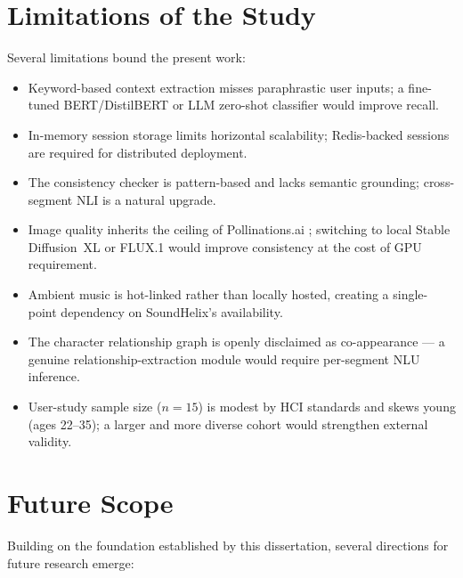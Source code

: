 \section{Limitations of the Study}
Several limitations bound the present work:

\begin{itemize}
    \item Keyword-based context extraction misses paraphrastic user
    inputs; a fine-tuned BERT/DistilBERT \cite{devlin2019bert,sanh2019distilbert}
    or LLM zero-shot classifier would improve recall.
    \item In-memory session storage limits horizontal scalability;
    Redis-backed sessions are required for distributed deployment.
    \item The consistency checker is pattern-based and lacks
    semantic grounding; cross-segment NLI \cite{williams2018mnli}
    is a natural upgrade.
    \item Image quality inherits the ceiling of Pollinations.ai
    \cite{pollinations2024api}; switching to local Stable
    Diffusion~XL \cite{podell2024sdxl} or FLUX.1 \cite{bfl2024flux}
    would improve consistency at the cost of GPU requirement.
    \item Ambient music is hot-linked rather than locally hosted,
    creating a single-point dependency on SoundHelix's availability.
    \item The character relationship graph is openly disclaimed as
    co-appearance --- a genuine relationship-extraction module
    would require per-segment NLU inference.
    \item User-study sample size ($n=15$) is modest by HCI standards
    and skews young (ages 22--35); a larger and more diverse cohort
    would strengthen external validity.
\end{itemize}

\section{Future Scope}
Building on the foundation established by this dissertation, several
directions for future research emerge:

